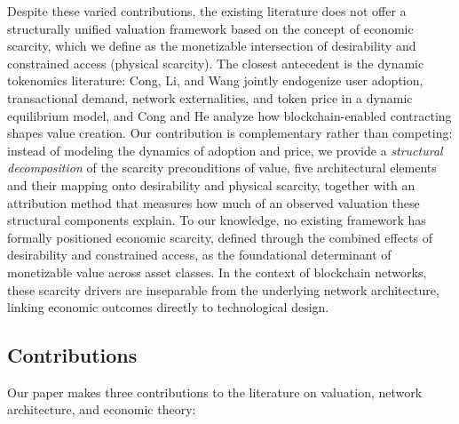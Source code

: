 \documentclass[12pt]{article}
\begin{document}
Despite these varied contributions, the existing literature does not offer a structurally unified valuation framework based on the concept of economic scarcity, which we define as the monetizable intersection of desirability and constrained access (physical scarcity). The closest antecedent is the dynamic tokenomics literature: Cong, Li, and Wang \citep{cong2021tokenomics} jointly endogenize user adoption, transactional demand, network externalities, and token price in a dynamic equilibrium model, and Cong and He \citep{cong2019blockchain} analyze how blockchain-enabled contracting shapes value creation. Our contribution is complementary rather than competing: instead of modeling the dynamics of adoption and price, we provide a \emph{structural decomposition} of the scarcity preconditions of value, five architectural elements and their mapping onto desirability and physical scarcity, together with an attribution method that measures how much of an observed valuation these structural components explain. To our knowledge, no existing framework has formally positioned economic scarcity, defined through the combined effects of desirability and constrained access, as the foundational determinant of monetizable value across asset classes. In the context of blockchain networks, these scarcity drivers are inseparable from the underlying network architecture, linking economic outcomes directly to technological design.

\subsection{Contributions}

Our paper makes three contributions to the literature on valuation, network architecture, and economic theory:
\end{document}
